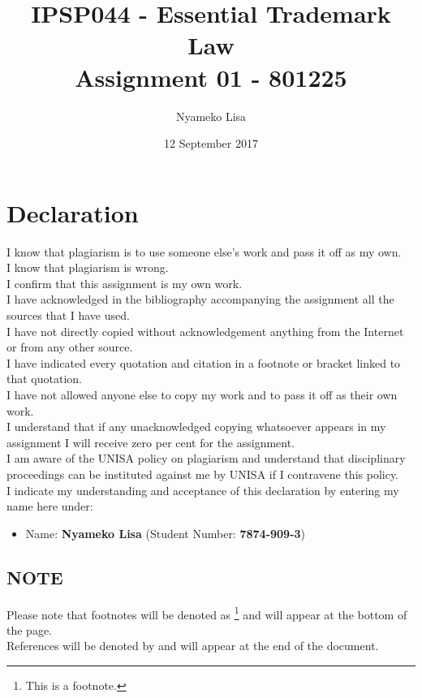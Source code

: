 \documentclass[11pt]{article}
\author{Nyameko Lisa}
\date{12 September 2017}
\title{IPSP044 - Essential Trademark Law\\\medskip
\large Assignment 01 - 801225}
\begin{document}
\maketitle
\addvspace{110pt}

\justifying
\addvspace{110pt}
\section*{Declaration}
\label{sec:org2abe201}
I know that plagiarism is to use someone else’s work and pass it off as my own.\\
I know that plagiarism is wrong.\\
I confirm that this assignment is my own work.\\
I have acknowledged in the bibliography accompanying the assignment all the sources that I have used.\\
I have not directly copied without acknowledgement anything from the Internet or from any other source.\\
I have indicated every quotation and citation in a footnote or bracket linked to that quotation.\\
I have not allowed anyone else to copy my work and to pass it off as their own work.\\
I understand that if any unacknowledged copying whatsoever appears in my assignment I will receive zero per cent for the assignment.\\
I am aware of the UNISA policy on plagiarism and understand that disciplinary proceedings can be instituted against me by UNISA if I contravene this policy.\\
I indicate my understanding and acceptance of this declaration by
entering my name here under:
\begin{itemize}
\item Name: \textbf{Nyameko Lisa} (Student Number: \textbf{7874-909-3})
\end{itemize}

\subsection*{NOTE}
\label{sec:org0e5ee47}
Please note that footnotes will be denoted as \footnote{This is a footnote.} and will
appear at the bottom of the page.\\
References will be denoted by \cite{rsa93_tm_act} and will appear at the end of the document.
\newpage
\end{document}
